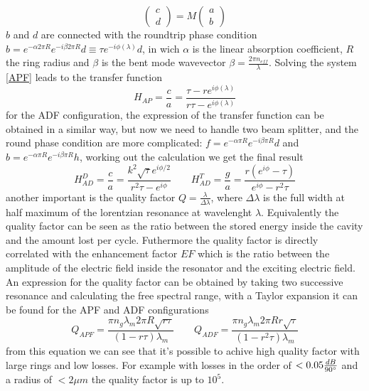 \begin{equation}\label{APF}\begin{pmatrix}c \\ d \end{pmatrix} = M \begin{pmatrix}a\\b \end{pmatrix}\end{equation}
$b$ and $d$ are connected with the roundtrip phase condition $b = e^{-\alpha 2\pi R} e^{-i\beta 2\pi R}d \equiv\tau e^{-i\phi(\lambda)}d $, in wich $\alpha$ is the linear absorption coefficient, $R$ the ring radius and $\beta$ is the bent mode wavevector $\beta = \frac{2\pi n_{eff}}{\lambda}$. Solving the system \eqref{APF} leads to the transfer function
\begin{equation}H_{AP} = \frac{c}{a} = \frac{\tau - re^{i\phi(\lambda)}}{r\tau -e^{i\phi(\lambda)}}\end{equation}
for the ADF configuration, the expression of the transfer function can be obtained in a similar way, but now we need to handle two beam splitter, and the round phase condition are more complicated: $f = e^{-\alpha \pi R} e^{-i\beta \pi R}d$ and $b=e^{-\alpha \pi R} e^{-i\beta \pi R}h$, working out the calculation we get the final result
\begin{equation}H^D_{AD} = \frac{c}{a} = \frac{k^2\sqrt{\tau} e^{i\phi/2}}{r^2\tau -e^{i\phi}}\qquad H^T_{AD} = \frac{g}{a} = \frac{r(e^{i\phi} - \tau)}{e^{i\phi}-r^2\tau} \end{equation}
another important is the quality factor $Q = \frac{\lambda}{\Delta \lambda}$, where $\Delta \lambda$ is the full width at half maximum of the lorentzian resonance at wavelenght $\lambda$. Equivalently the quality factor can be seen as the ratio between the stored energy inside the cavity and the amount lost per cycle. Futhermore the quality factor is directly correlated with the enhancement factor $EF$ which is the ratio between the amplitude of the electric field inside the resonator and the exciting electric field. An expression for the quality factor can be obtained by taking two successive resonance and calculating the free spectral range, with a Taylor expansion it can be found \cite{thesis:borghi} for the APF and ADF configurations
\begin{equation}
Q_{APF} = \frac{\pi n_g \lambda_m 2\pi R \sqrt{r\tau}}{(1-r\tau)\lambda_m} \qquad Q_{ADF} = \frac{\pi n_g \lambda_m 2\pi R r\sqrt{\tau}}{(1-r^2\tau)\lambda_m}
\end{equation}
from this equation we can see that it's possible to achive high quality factor with large rings and low losses. For example with losses in the order of $< 0.05 \frac{dB}{90\degree}$ and a radius of $< 2\mu m$ the quality factor is up to $10^5$.
